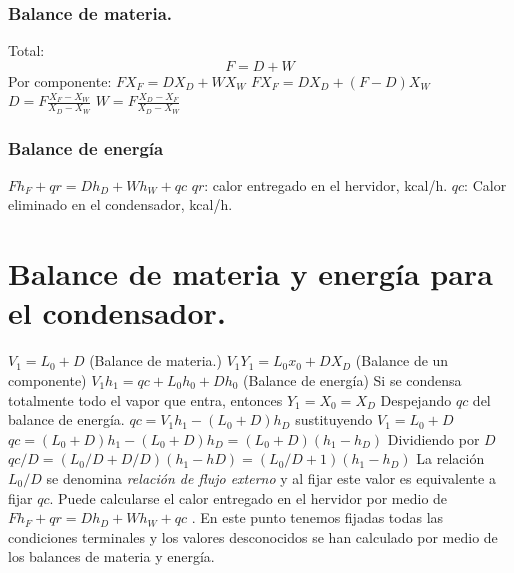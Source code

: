 \documentclass[11pt,openany]{book}
\begin{document}
\subsubsection{Balance de materia.}
Total: 
\begin{equation}
\boxed{F=D+W}
\end{equation}
\newline\newline
Por componente: $F X_F = D X_D + W X_W$
\newline\newline
$F X_F = D X_D + (F-D) X_W$
\newline\newline
$D=F \frac{X_F - X_W}{X_D-X_W}$
\newline\newline
$W=F \frac{X_D - X_F}{X_D-X_W}$
\subsubsection{Balance de energía}
$F h_F +qr = D h_D + W h_W + qc$
\newline\newline
$qr$: calor entregado en el hervidor, kcal/h.
$qc$: Calor eliminado en el condensador, kcal/h.
\section{Balance de materia y energía para el condensador.}
$V_1 = L_0 + D$ (Balance de materia.)
\newline\newline
$V_1 Y_1= L_0 x_0 + D X_D$ (Balance de un componente)
\newline\newline
$V_1 h_1 = qc + L_0 h_0 + D h_0$ (Balance de energía)
\newline\newline
Si se condensa totalmente todo el vapor que entra, entonces
\newline\newline
$Y_1 = X_0 = X_D$
Despejando $qc$ del balance de energía.
$qc = V_1 h_1 - (L_0+D)h_D$
\newline\newline
sustituyendo $V_1=L_0 +D$
\newline\newline
$qc=(L_0+D)h_1 - (L_0+D)h_D = (L_0+D)(h_1-h_D)$
\newline\newline
Dividiendo por $D$
\newline\newline
$qc/D = (L_0/D + D/D)(h_1-hD)=(L_0/D +1)(h_1-h_D)$
\newline\newline
La relación $L_0/D$ se denomina \textit{relación de flujo externo} y al fijar este valor es equivalente a 
fijar $qc$. Puede calcularse el calor entregado en el hervidor por medio de 
$F h_F + qr = D h_D + W h_W + qc$ . En este punto tenemos fijadas todas las condiciones terminales y los valores 
desconocidos se han calculado por medio de los balances de materia y energía.
\end{document}
